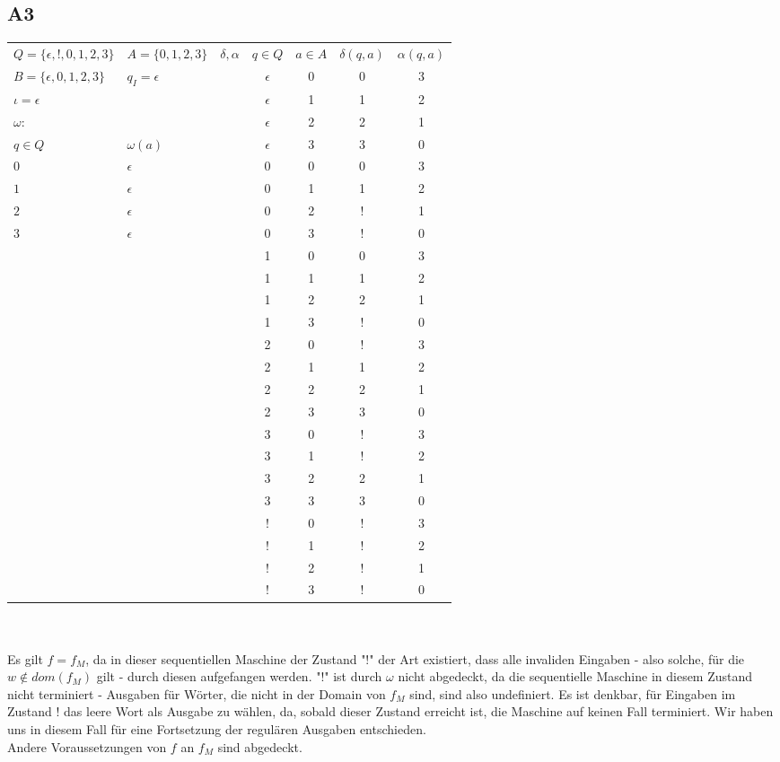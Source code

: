 \documentclass[12pt, a4paper]{article}
\begin{document}
\subsection*{A3}
\begin{tabular}{l l || c c c | c c}
    \(Q = \{ \epsilon, !, 0, 1, 2, 3 \}\) & \(A = \{0,1,2,3 \}\) & \(\delta, \alpha\) & \(q\in Q\)& \(a \in A\) & \(\delta(q,a)\)&\(\alpha(q,a)\)\\
    \(B = \{ \epsilon, 0,1,2,3 \}\) & \(q_I = \epsilon\) && \(\epsilon\) & 0 & 0 & 3\\
    \(\iota = \epsilon\) &&& \(\epsilon\) & 1 & 1 & 2\\
    \(\omega\):&&& \(\epsilon\) & 2 & 2 & 1\\
    \(q \in Q \)&\(\omega (a)\)&& \(\epsilon\) & 3 & 3 & 0\\
    \( 0 \)&\(\epsilon\)&& 0& 0 & 0 & 3\\
    \( 1 \)& \(\epsilon\)&& 0 & 1 & 1 & 2\\
    \(2\)& \(\epsilon\) & & 0 & 2 & ! & 1\\
    3&\(\epsilon\)&&0&3&!&0\\
    &&&1&0&0&3\\
    &&&1&1&1&2\\
    &&&1&2&2&1\\
    &&&1&3&!&0\\
    &&&2&0&!&3\\
    &&&2&1&1&2\\
    &&&2&2&2&1\\
    &&&2&3&3&0\\
    &&&3&0&!&3\\
    &&&3&1&!&2\\
    &&&3&2&2&1\\
    &&&3&3&3&0\\
    &&&!&0&!&3\\
    &&&!&1&!&2\\
    &&&!&2&!&1\\
    &&&!&3&!&0\\
\end{tabular}\\\\
Es gilt \(f = f_M\), da in dieser sequentiellen Maschine der Zustand "!" der Art existiert, dass alle invaliden Eingaben - also solche, für die \(w \notin dom(f_M)\) gilt - durch diesen aufgefangen werden.
"!" ist durch \(\omega\) nicht abgedeckt, da die sequentielle Maschine in diesem Zustand nicht terminiert - Ausgaben für Wörter, die nicht in der Domain von \(f_M\) sind, sind also undefiniert.
Es ist denkbar, für Eingaben im Zustand ! das leere Wort als Ausgabe zu wählen, da, sobald dieser Zustand erreicht ist, die Maschine auf keinen Fall terminiert. 
Wir haben uns in diesem Fall für eine Fortsetzung der regulären Ausgaben entschieden.\\
Andere Voraussetzungen von \(f\) an \(f_M\) sind abgedeckt.
\end{document}
